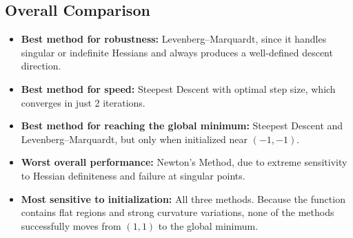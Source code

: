 \documentclass[11pt]{article}
\begin{document}
\subsection{Overall Comparison}

\begin{itemize}
\item \textbf{Best method for robustness:}  
Levenberg--Marquardt, since it handles singular or indefinite Hessians and always produces a well-defined descent direction.

\item \textbf{Best method for speed:}  
Steepest Descent with optimal step size, which converges in just 2 iterations.

\item \textbf{Best method for reaching the global minimum:}  
Steepest Descent and Levenberg--Marquardt, but only when initialized near $(-1,-1)$.

\item \textbf{Worst overall performance:}  
Newton’s Method, due to extreme sensitivity to Hessian definiteness and failure at singular points.

\item \textbf{Most sensitive to initialization:}  
All three methods.  
Because the function contains flat regions and strong curvature variations, none of the methods successfully moves from $(1,1)$ to the global minimum.
\end{itemize}
\end{document}
